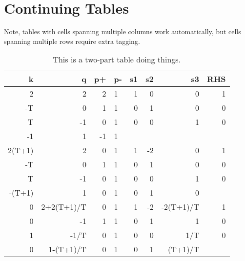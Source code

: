 \section{Continuing Tables}
Note, tables with cells spanning multiple columns work automatically, but cells spanning multiple rows require extra tagging.
\begin{table}[ht]
    \caption{This is a two-part table doing things.}
    \begin{tabular}{rrrlrrrr}
        k      & q          & p+ & p- & s1        & s2         & s3          & RHS       \\ \hline
        2      & 2          & 2  & 1 & 1         & 0          & 0           & 1         \\
        -T     & 0          & 1  & 1 & 0         & 1          & 0           & 0         \\
        T      & -1         & 0  & 1 & 0         & 0          & 1           & 0         \\
        -1     & 1          & -1 & 1 &           &            &             &           \\ \hline
        2(T+1) & 2          & 0  & 1 & 1         & -2         & 0           & 1         \\ \hline
        -T     & 0          & 1  & 1 & 0         & 1          & 0           & 0         \\
        T      & -1         & 0  & 1 & 0         & 0          & 1           & 0         \\
        -(T+1) & 1          & 0  & 1 & 0         & 1          & 0           &           \\ \hline
        0      & 2+2(T+1)/T & 0  & 1 & 1         & -2         & -2(T+1)/T   & 1         \\ \hline
        0      & -1         & 1  & 1 & 0         & 1          & 1           & 0         \\
        1      & -1/T       & 0  & 1 & 0         & 0          & 1/T         & 0         \\
        0      & 1-(T+1)/T  & 0  & 1 & 0         & 1          & (T+1)/T     &           \\ \hline

\end{tabular}
\end{table}
